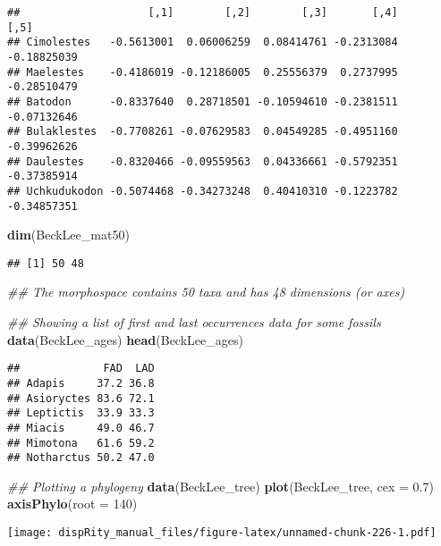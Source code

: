 \documentclass[
]{book}
\newenvironment{Shaded}{\begin{snugshade}}{\end{snugshade}}
\newcommand{\CommentTok}[1]{\textcolor[rgb]{0.56,0.35,0.01}{\textit{#1}}}
\newcommand{\DataTypeTok}[1]{\textcolor[rgb]{0.13,0.29,0.53}{#1}}
\newcommand{\DecValTok}[1]{\textcolor[rgb]{0.00,0.00,0.81}{#1}}
\newcommand{\FloatTok}[1]{\textcolor[rgb]{0.00,0.00,0.81}{#1}}
\newcommand{\KeywordTok}[1]{\textcolor[rgb]{0.13,0.29,0.53}{\textbf{#1}}}
\newcommand{\NormalTok}[1]{#1}
\begin{document}
\begin{verbatim}
##                    [,1]        [,2]        [,3]       [,4]        [,5]
## Cimolestes   -0.5613001  0.06006259  0.08414761 -0.2313084 -0.18825039
## Maelestes    -0.4186019 -0.12186005  0.25556379  0.2737995 -0.28510479
## Batodon      -0.8337640  0.28718501 -0.10594610 -0.2381511 -0.07132646
## Bulaklestes  -0.7708261 -0.07629583  0.04549285 -0.4951160 -0.39962626
## Daulestes    -0.8320466 -0.09559563  0.04336661 -0.5792351 -0.37385914
## Uchkudukodon -0.5074468 -0.34273248  0.40410310 -0.1223782 -0.34857351
\end{verbatim}

\begin{Shaded}
\begin{Highlighting}[]
\KeywordTok{dim}\NormalTok{(BeckLee\_mat50)}
\end{Highlighting}
\end{Shaded}

\begin{verbatim}
## [1] 50 48
\end{verbatim}

\begin{Shaded}
\begin{Highlighting}[]
\CommentTok{\#\# The morphospace contains 50 taxa and has 48 dimensions (or axes)}

\CommentTok{\#\# Showing a list of first and last occurrences data for some fossils}
\KeywordTok{data}\NormalTok{(BeckLee\_ages)}
\KeywordTok{head}\NormalTok{(BeckLee\_ages)}
\end{Highlighting}
\end{Shaded}

\begin{verbatim}
##             FAD  LAD
## Adapis     37.2 36.8
## Asioryctes 83.6 72.1
## Leptictis  33.9 33.3
## Miacis     49.0 46.7
## Mimotona   61.6 59.2
## Notharctus 50.2 47.0
\end{verbatim}

\begin{Shaded}
\begin{Highlighting}[]
\CommentTok{\#\# Plotting a phylogeny}
\KeywordTok{data}\NormalTok{(BeckLee\_tree)}
\KeywordTok{plot}\NormalTok{(BeckLee\_tree, }\DataTypeTok{cex =} \FloatTok{0.7}\NormalTok{)}
\KeywordTok{axisPhylo}\NormalTok{(}\DataTypeTok{root =} \DecValTok{140}\NormalTok{)}
\end{Highlighting}
\end{Shaded}

\texttt{[image: dispRity\_manual\_files/figure-latex/unnamed-chunk-226-1.pdf]}
\end{document}
